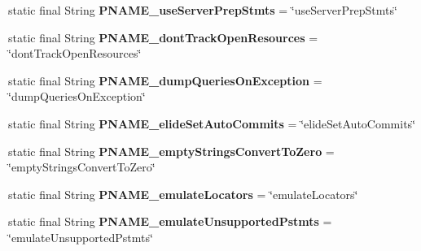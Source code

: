 \begin{DoxyCompactItemize}
static final String {\bfseries P\+N\+A\+M\+E\+\_\+use\+Server\+Prep\+Stmts} = \char`\"{}use\+Server\+Prep\+Stmts\char`\"{}
\item 
\mbox{\label{classcom_1_1mysql_1_1cj_1_1conf_1_1_property_definitions_a0a9de8d96dfff9f008092e5285b7c4be}} 
static final String {\bfseries P\+N\+A\+M\+E\+\_\+dont\+Track\+Open\+Resources} = \char`\"{}dont\+Track\+Open\+Resources\char`\"{}
\item 
\mbox{\label{classcom_1_1mysql_1_1cj_1_1conf_1_1_property_definitions_af3c98169e9425d122861d2ee4a61d81a}} 
static final String {\bfseries P\+N\+A\+M\+E\+\_\+dump\+Queries\+On\+Exception} = \char`\"{}dump\+Queries\+On\+Exception\char`\"{}
\item 
\mbox{\label{classcom_1_1mysql_1_1cj_1_1conf_1_1_property_definitions_a6d8f17d3fbf751c846003db86b6ec7ae}} 
static final String {\bfseries P\+N\+A\+M\+E\+\_\+elide\+Set\+Auto\+Commits} = \char`\"{}elide\+Set\+Auto\+Commits\char`\"{}
\item 
\mbox{\label{classcom_1_1mysql_1_1cj_1_1conf_1_1_property_definitions_a64c01544c9788c8869dafb7c1edce838}} 
static final String {\bfseries P\+N\+A\+M\+E\+\_\+empty\+Strings\+Convert\+To\+Zero} = \char`\"{}empty\+Strings\+Convert\+To\+Zero\char`\"{}
\item 
\mbox{\label{classcom_1_1mysql_1_1cj_1_1conf_1_1_property_definitions_a36e27525977e55e511a03389cf044bfa}} 
static final String {\bfseries P\+N\+A\+M\+E\+\_\+emulate\+Locators} = \char`\"{}emulate\+Locators\char`\"{}
\item 
\mbox{\label{classcom_1_1mysql_1_1cj_1_1conf_1_1_property_definitions_a129407d7ef935e704ca85ffb73eae8d4}} 
static final String {\bfseries P\+N\+A\+M\+E\+\_\+emulate\+Unsupported\+Pstmts} = \char`\"{}emulate\+Unsupported\+Pstmts\char`\"{}
\item 
\mbox{\label{classcom_1_1mysql_1_1cj_1_1conf_1_1_property_definitions_aa65831137f93581e02976220f8e7a475}} 

\end{DoxyCompactItemize}
